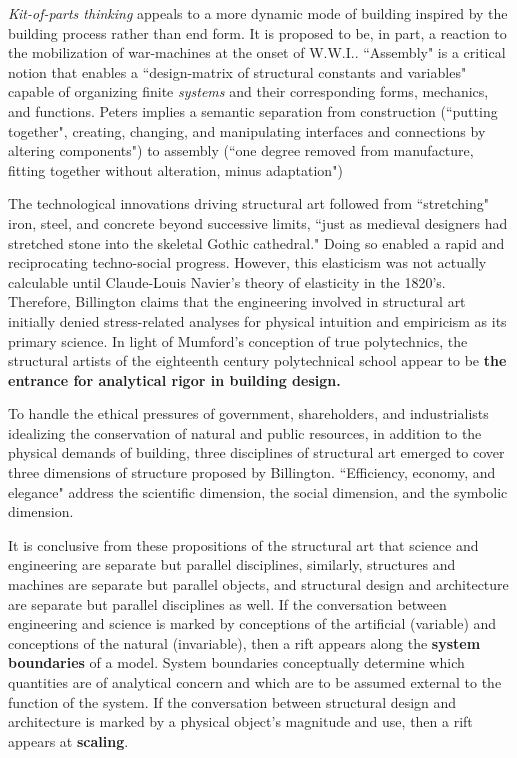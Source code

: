 \textit{Kit-of-parts thinking} appeals to a more dynamic mode of building inspired by the building process rather than end form. It is proposed to be, in part, a reaction to the mobilization of war-machines at the onset of W.W.I.. ``Assembly" is a critical notion that enables a ``design-matrix of structural constants and variables" capable of organizing finite \textit{systems} and their corresponding forms, mechanics, and functions. Peters implies a semantic separation from construction (``putting together", creating, changing, and manipulating interfaces and connections by altering components") to assembly (``one degree removed from manufacture, fitting together without alteration, minus adaptation") \cite[p53]{IRON}




The technological innovations driving structural art followed from ``stretching" iron, steel, and concrete beyond successive limits, ``just as medieval designers had stretched stone into the skeletal Gothic cathedral." \cite[p5]{TOWERANDBRIDGE} Doing so enabled a rapid and reciprocating techno-social progress. However, this elasticism was not actually calculable until Claude-Louis Navier's theory of elasticity in the 1820's. \cite[p73]{RETROFITTINGMASONRY} Therefore, Billington claims that the engineering involved in structural art initially denied stress-related analyses for physical intuition and empiricism as its primary science. \cite[p43]{TOWERANDBRIDGE} In light of Mumford's conception of true polytechnics, the structural artists of the eighteenth century polytechnical school appear to be \textbf{the entrance for analytical rigor in building design.}


To handle the ethical pressures of government, shareholders, and industrialists idealizing the conservation of natural and public resources, in addition to the physical demands of building, three disciplines of structural art emerged to cover three dimensions of structure proposed by Billington. ``Efficiency, economy, and elegance" address the scientific dimension, the social dimension, and the symbolic dimension. \cite[p5,16,17]{TOWERANDBRIDGE}




It is conclusive from these propositions of the structural art that science and engineering are separate but parallel disciplines, similarly, structures and machines are separate but parallel objects, and structural design and architecture are separate but parallel disciplines as well. If the conversation between engineering and science is marked by conceptions of the artificial (variable) and conceptions of the natural (invariable), then a rift appears along the \textbf{system boundaries} of a model. System boundaries conceptually determine which quantities are of analytical concern and which are to be assumed external to the function of the system. If the conversation between structural design and architecture is marked by a physical object's magnitude and use, then a rift appears at \textbf{scaling}.

